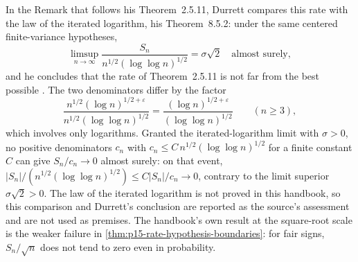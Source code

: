 In the Remark that follows his Theorem~2.5.11, Durrett compares this
rate with the law of the iterated logarithm, his Theorem~8.5.2: under
the same centered finite-variance hypotheses,
\[
 \limsup_{n\to\infty}\frac{S_n}{n^{1/2}(\log\log n)^{1/2}}
     =\sigma\sqrt2\quad\text{almost surely},
\]
and he concludes that the rate of Theorem~2.5.11 is not far from the
best possible \cite[p.~87]{DurrettPTEAuthor2019}. The two denominators
differ by the factor
\[
 \frac{n^{1/2}(\log n)^{1/2+\varepsilon}}{n^{1/2}(\log\log n)^{1/2}}
   =\frac{(\log n)^{1/2+\varepsilon}}{(\log\log n)^{1/2}}
   \qquad(n\geq3),
\]
which involves only logarithms. Granted the iterated-logarithm limit
with \(\sigma>0\), no positive denominators \(c_n\) with
\(c_n\leq C\,n^{1/2}(\log\log n)^{1/2}\) for a finite constant \(C\)
can give \(S_n/c_n\to0\) almost surely: on that event,
\(|S_n|/(n^{1/2}(\log\log n)^{1/2})\leq C|S_n|/c_n\to0\), contrary to
the limit superior \(\sigma\sqrt2>0\). The law of the iterated
logarithm is not proved in this handbook, so this comparison and
Durrett's conclusion are reported as the source's assessment and are
not used as premises. The handbook's own result at the square-root
scale is the weaker failure in
\cref{thm:p15-rate-hypothesis-boundaries}: for fair signs,
\(S_n/\sqrt n\) does not tend to zero even in probability.
